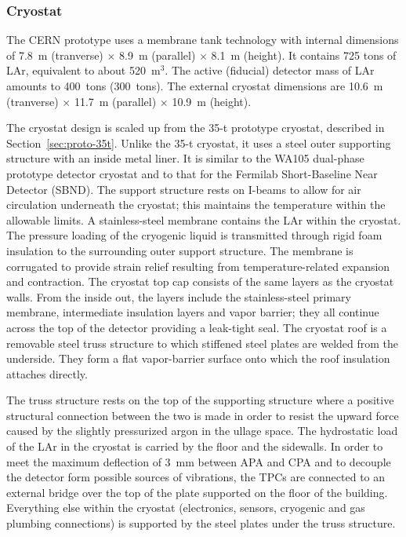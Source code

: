 \subsubsection{Cryostat}

The CERN prototype uses a membrane tank technology with internal
dimensions of 7.8~m (tranverse) $\times$ 8.9~m (parallel) $\times$ 8.1~m
(height).  It contains 725 tons of LAr, equivalent to about
520~m$^3$. 
The active (fiducial) detector mass of LAr amounts to
400~tons (300~tons).  The external cryostat dimensions are 10.6~m
(tranverse) $\times$ 11.7~m (parallel) $\times$ 10.9~m (height).

The cryostat design is scaled up from the 35-t prototype
cryostat\cite{bib:membcryo1573}, described in
Section~\ref{sec:proto-35t}.  Unlike the 35-t cryostat, it uses a
steel outer supporting structure with an inside metal liner.  It is
similar to the WA105 dual-phase prototype detector cryostat and to
that for the Fermilab Short-Baseline Near Detector
(SBND)\cite{bib:SBND}.  The support structure rests on I-beams to
allow for air circulation underneath the cryostat; this maintains the
temperature within the allowable limits.  A stainless-steel membrane
contains the LAr within the cryostat. The pressure loading of the
cryogenic liquid is transmitted through rigid foam insulation to the
surrounding outer support structure. The membrane is corrugated to
provide strain relief resulting from temperature-related expansion and
contraction. The cryostat top cap consists of the same layers as the
cryostat walls.  From the inside out, the layers include the
stainless-steel primary membrane, intermediate insulation layers and
vapor barrier; they all continue across the top of the detector
providing a leak-tight seal.  The cryostat roof is a removable steel
truss structure to which stiffened steel plates are welded from the
underside. They form a flat vapor-barrier surface onto which the roof
insulation attaches directly.


The truss structure rests on the top of the supporting structure where
a positive structural connection between the two is made in order to
resist the upward force caused by the slightly pressurized argon in
the ullage space. The hydrostatic load of the LAr in the cryostat is
carried by the floor and the sidewalls. In order to meet the maximum
deflection of 3~mm between APA and CPA and to decouple the detector
form possible sources of vibrations, the TPCs are connected to an
external bridge over the top of the plate supported on the floor of
the building. Everything else within the cryostat (electronics,
sensors, cryogenic and gas plumbing connections) is supported by the
steel plates under the truss structure.

